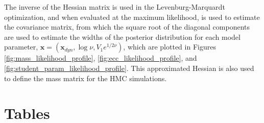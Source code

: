 \documentclass[twocolumn]{aastex63}
\begin{document}
The inverse of the Hessian matrix is used in the Levenburg-Marquardt optimization, and when evaluated at the maximum likelihood, is used to estimate the covariance matrix, from which the square root of the diagonal components are used to estimate the widths of the posterior distribution for each model parameter, $\mathbf{x} = (\mathbf{x}_{dyn},\log \nu, V_1 e^{1/2\nu})$, which are plotted in Figures \ref{fig:mass_likelihood_profile}, \ref{fig:ecc_likelihood_profile}, and \ref{fig:student_param_likelihood_profile}.  This approximated Hessian is also used to define the mass matrix for the HMC simulations.

\section{Tables}
\end{document}
